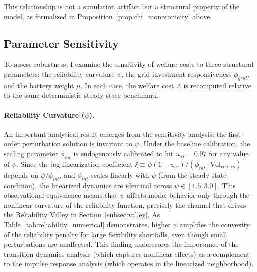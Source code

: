 \documentclass[12pt, a4paper]{article}
\begin{document}
	This relationship is not a simulation artifact but a structural property of the model, as formalized in Proposition~\ref{prop:chi_monotonicity} above.

	\subsection{Parameter Sensitivity}

	To assess robustness, I examine the sensitivity of welfare costs to three structural parameters: the reliability curvature $\psi$, the grid investment responsiveness $\phi_{grid}$, and the battery weight $\mu$. In each case, the welfare cost $\Lambda$ is recomputed relative to the same deterministic steady-state benchmark.

	\paragraph{Reliability Curvature ($\psi$).} An important analytical result emerges from the sensitivity analysis: the first-order perturbation solution is invariant to $\psi$. Under the baseline calibration, the scaling parameter $\phi_{int}$ is endogenously calibrated to hit $u_{ss} = 0.97$ for any value of $\psi$. Since the log-linearization coefficient $\xi \equiv \psi(1-u_{ss})/(\phi_{int} \cdot \text{Vol}_{ren,ss})$ depends on $\psi / \phi_{int}$, and $\phi_{int}$ scales linearly with $\psi$ (from the steady-state condition), the linearized dynamics are identical across $\psi \in [1.5, 3.0]$. This observational equivalence means that $\psi$ affects model behavior only through the nonlinear curvature of the reliability function, precisely the channel that drives the Reliability Valley in Section~\ref{subsec:valley}. As Table~\ref{tab:reliability_numerical} demonstrates, higher $\psi$ amplifies the convexity of the reliability penalty for large flexibility shortfalls, even though small perturbations are unaffected. This finding underscores the importance of the transition dynamics analysis (which captures nonlinear effects) as a complement to the impulse response analysis (which operates in the linearized neighborhood).
\end{document}

